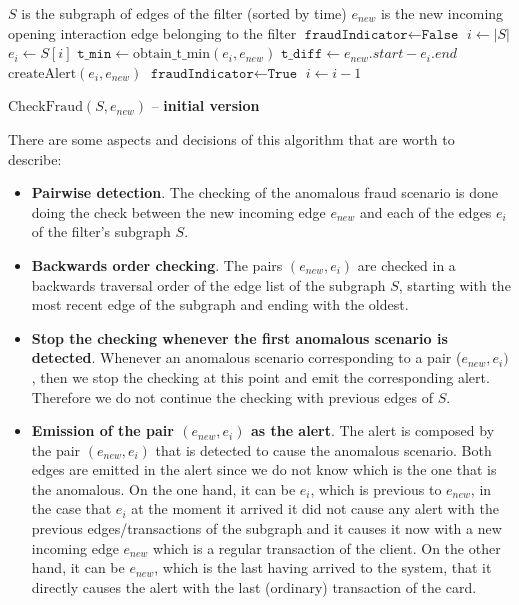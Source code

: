 \documentclass{article}
\begin{document}
\begin{algorithm}[H]
    \small
    \begin{algorithmic}[1]
    \REQUIRE $S$ is the subgraph of edges of the filter (sorted by time)
    \REQUIRE $e_{new}$ is the new incoming opening interaction edge belonging to the filter 
    \STATE $\texttt{fraudIndicator} \gets \texttt{False}$
    \STATE $i \gets |S|$
      \STATE $e_i \gets S[i]$
      \STATE $\texttt{t\_min} \gets \text{obtain\_t\_min}(e_i, e_{new})$
      \STATE $\texttt{t\_diff} \gets e_{new}.start - e_i.end$
        \STATE $\text{createAlert}(e_i, e_{new})$
        \STATE $\texttt{fraudIndicator} \gets \texttt{True}$
      \ENDIF
      \STATE $i \gets i - 1$
    \ENDWHILE
    \end{algorithmic}
    \caption{$\text{CheckFraud}(S, e_{new})$ -- \textbf{initial version}}
    \label{alg:check-fraud-1}
\end{algorithm}

There are some aspects and decisions of this algorithm that are worth to describe:

\begin{itemize}
    \item \textbf{Pairwise detection}. The checking of the anomalous fraud scenario is done doing the check between the new incoming edge $e_{new}$ and each of the edges $e_i$ of the filter's subgraph $S$.
    \item \textbf{Backwards order checking}. The pairs $(e_{new}, e_i)$ are checked in a backwards traversal order of the edge list of the subgraph $S$, starting with the most recent edge of the subgraph and ending with the oldest.  
    \item \textbf{Stop the checking whenever the first anomalous scenario is detected}. Whenever an anomalous scenario corresponding to a pair ($e_{new}, e_i)$, then we stop the checking at this point and emit the corresponding alert. Therefore we do not continue the checking with previous edges of $S$. 
    \item \textbf{Emission of the pair $(e_{new}, e_i)$ as the alert}. The alert is composed by the pair $(e_{new}, e_i)$ that is detected to cause the anomalous scenario. Both edges are emitted in the alert since we do not know which is the one that is the anomalous. On the one hand, it can be $e_i$, which is previous to $e_{new}$, in the case that $e_i$ at the moment it arrived it did not cause any alert with the previous edges/transactions of the subgraph and it causes it now with a new incoming edge $e_{new}$ which is a regular transaction of the client. On the other hand, it can be $e_{new}$, which is the last having arrived to the system, that it directly causes the alert with the last (ordinary) transaction of the card.
\end{itemize}
\end{document}
